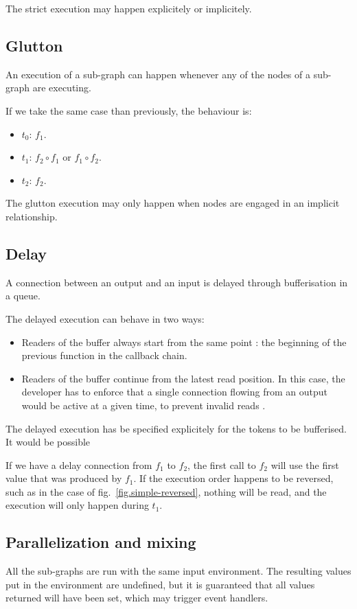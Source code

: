 \documentclass{article}
\begin{document}
The strict execution may happen explicitely or implicitely.
    
\subsection{Glutton}
An execution of a sub-graph can happen whenever any of the nodes of a sub-graph are executing. 
    
If we take the same case than previously, the behaviour is:
\begin{itemize}
  \item $t_0$: $f_1$.
  \item $t_1$: $f_2 \circ f_1$ or $f_1 \circ f_2$.
  \item $t_2$: $f_2$. 
\end{itemize}

The glutton execution may only happen when nodes are engaged in an implicit relationship.
    
\subsection{Delay}
A connection between an output and an input is delayed through bufferisation in a queue.
	
The delayed execution can behave in two ways:
\begin{itemize}
  \item Readers of the buffer always start from the same point : the beginning of the previous function in the callback chain.
  \item Readers of the buffer continue from the latest read position.
        In this case, the developer has to enforce that a single connection flowing from an output would be active at a given time, to prevent invalid reads .%
\end{itemize}
	
    
The delayed execution has be specified explicitely for the tokens to be bufferised.
It would be possible
    
If we have a delay connection from $f_1$ to $f_2$, the first call to $f_2$ will use the first value that was produced by $f_1$.
If the execution order happens to be reversed, such as in the case of fig.~\ref{fig.simple-reversed}, nothing will be read, and the execution will only happen during $t_1$.
	
\subsection{Parallelization and mixing}
All the sub-graphs are run with the same input environment. 
The resulting values put in the environment are undefined, but it is guaranteed that all values returned will have been set, which may trigger event handlers.
    
\end{document}
